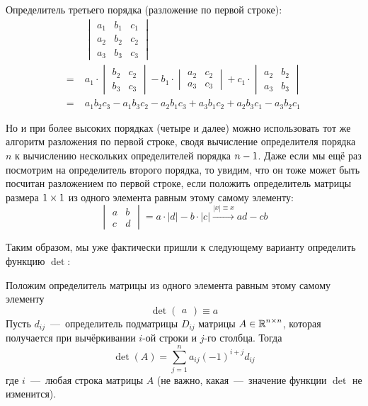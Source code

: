 \documentclass[a4paper,12pt]{article}
\begin{document}
  \begin{example}
    Определитель третьего порядка (разложение по первой строке):
    \begin{equation*}
    \begin{split}
      &\begin{vmatrix}
        a_1 & b_1 & c_1\\
        a_2 & b_2 & c_2\\
        a_3 & b_3 & c_3
      \end{vmatrix}\\
        =\; &a_1 \cdot \begin{vmatrix}b_2 & c_2\\b_3 & c_3\end{vmatrix}
        - b_1 \cdot \begin{vmatrix}a_2 & c_2\\a_3 & c_3\end{vmatrix}
        + c_1 \cdot \begin{vmatrix}a_2 & b_2\\a_3 & b_3\end{vmatrix}\\
        =\; &a_1 b_2 c_3 - a_1 b_3 c_2 - a_2 b_1 c_3 + a_3 b_1 c_2 + a_2 b_3 c_1 - a_3 b_2 c_1
    \end{split}
    \end{equation*}
  \end{example}
  
  Но и при более высоких порядках (четыре и далее) можно использовать тот же алгоритм разложения по первой строке, сводя вычисление определителя порядка $n$ к вычислению нескольких определителей порядка $n \hm- 1$.
  Даже если мы ещё раз посмотрим на определитель второго порядка, то увидим, что он тоже может быть посчитан разложением по первой строке, если положить определитель матрицы размера $1 \hm\times 1$ из одного элемента равным этому самому элементу:
  \[
    \begin{vmatrix}
      a & b\\
      c & d
    \end{vmatrix}
    = a \cdot |d| - b \cdot |c|
    \xrightarrow{|x| \equiv x} ad - cb
  \]
  
  Таким образом, мы уже фактически пришли к следующему варианту определить функцию $\det$:
  
  \begin{definition}
    Положим определитель матрицы из одного элемента равным этому самому элементу
    \[
      \det \begin{pmatrix}a\end{pmatrix} \equiv a
    \]
    Пусть $d_{ij}$~---~определитель подматрицы $D_{ij}$ матрицы $A \in \operatorname{\mathbb R}^{n \times n}$, которая получается при вычёркивании $i$-ой строки и $j$-го столбца.
    Тогда
    \[
      \det(A) = \sum\limits_{j = 1}^n a_{ij} (-1)^{i + j} d_{ij}
    \]
    где $i$~---~любая строка матрицы $A$ (не важно, какая~---~значение функции $\det$ не изменится).
  \end{definition}
  
\end{document}
